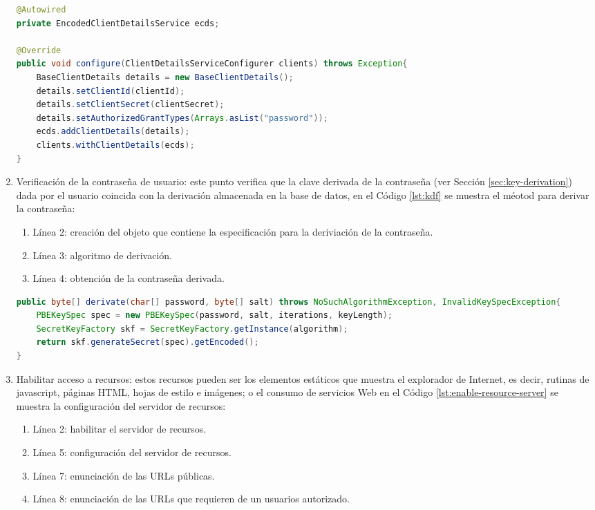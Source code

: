 \begin{enumerate}
\begin{lstlisting}[language=Java, caption={Clase de autenticación de cliente.}, captionpos=b, label={lst:client-auth}]
@Autowired
private EncodedClientDetailsService ecds;

@Override
public void configure(ClientDetailsServiceConfigurer clients) throws Exception{
	BaseClientDetails details = new BaseClientDetails();
	details.setClientId(clientId);
	details.setClientSecret(clientSecret);
	details.setAuthorizedGrantTypes(Arrays.asList("password"));
	ecds.addClientDetails(details);
	clients.withClientDetails(ecds);
}
\end{lstlisting}

	\item Verificación de la contraseña de usuario: este punto verifica que la clave derivada de la contraseña (ver Sección \ref{sec:key-derivation}) dada por el usuario coincida con la derivación almacenada en la base de datos, en el Código \ref{lst:kdf} se muestra el méotod para derivar la contraseña:
	\begin{enumerate}
		\item Línea 2: creación del objeto que contiene la especificación para la deriviación de la contraseña.
		\item Línea 3: algoritmo de derivación.
		\item Línea 4: obtención de la contraseña derivada.
	\end{enumerate}
\begin{lstlisting}[language=Java, caption={Derivación de la constraseña de usuario.}, captionpos=b, label={lst:kdf}]
public byte[] derivate(char[] password, byte[] salt) throws NoSuchAlgorithmException, InvalidKeySpecException{
	PBEKeySpec spec = new PBEKeySpec(password, salt, iterations, keyLength);
	SecretKeyFactory skf = SecretKeyFactory.getInstance(algorithm);
	return skf.generateSecret(spec).getEncoded();
}
\end{lstlisting}


	\item Habilitar acceso a recursos: estos recursos pueden ser los elementos estáticos que muestra el explorador de Internet, es decir, rutinas de javascript, páginas HTML, hojas de estilo e imágenes; o el consumo de servicios Web en el Código \ref{lst:enable-resource-server} se muestra la configuración del servidor de recursos:

	\begin{enumerate}
		\item Línea 2: habilitar el servidor de recursos.
		\item Línea 5: configuración del servidor de recursos.
		\item Línea 7: enunciación de las URLs públicas.
		\item Línea 8: enunciación de las URLs que requieren de un usuarios autorizado. 
	\end{enumerate}


\end{enumerate}
